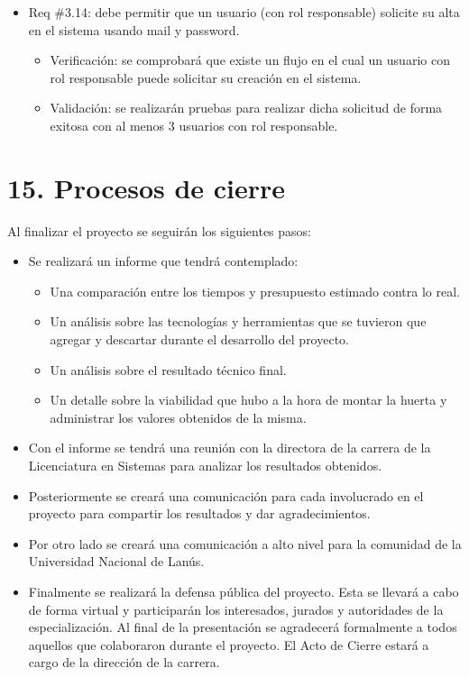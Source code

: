 \documentclass[
11pt, %
codirector, %
]{charter}
\begin{document}
\begin{itemize}
\begin{itemize}
	\item Req \#3.14: debe permitir que un usuario (con rol responsable) solicite su alta en el sistema usando mail y password.
		\begin{itemize}
		\item Verificación: se comprobará que existe un flujo en el cual un usuario con rol responsable puede solicitar su creación en el sistema.
		\item Validación: se realizarán pruebas para realizar dicha solicitud de forma exitosa con al menos 3 usuarios con rol responsable.
		\end{itemize}
		
\end{itemize}
\end{itemize}

\section{15. Procesos de cierre}    
\label{sec:cierre}

Al finalizar el proyecto se seguirán los siguientes pasos:

\begin{itemize}
	\item Se realizará un informe que tendrá contemplado:
	\begin{itemize}
		\item Una comparación entre los tiempos y presupuesto estimado contra lo real.
		\item Un análisis sobre las tecnologías y herramientas que se tuvieron que agregar y descartar durante el desarrollo del proyecto.
		\item Un análisis sobre el resultado técnico final.
		\item Un detalle sobre la viabilidad que hubo a la hora de montar la huerta y administrar los valores obtenidos de la misma.
	\end{itemize}
	\item Con el informe se tendrá una reunión con la directora de la carrera de la Licenciatura en Sistemas para analizar los resultados obtenidos.
	\item Posteriormente se creará una comunicación para cada involucrado en el proyecto para compartir los resultados y dar agradecimientos.
	\item Por otro lado se creará una comunicación a alto nivel para la comunidad de la Universidad Nacional de Lanús.
	\item Finalmente se realizará la defensa pública del proyecto. Esta se llevará a cabo de forma virtual y participarán los interesados, jurados y autoridades de la especialización. Al final de la presentación se agradecerá formalmente a todos aquellos que colaboraron durante el proyecto. El Acto de Cierre estará a cargo de la dirección de la carrera.	
	
	
\end{itemize}
\end{document}
